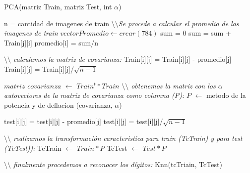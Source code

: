 \begin{algorithm}[H]
\caption{PCA(matriz Train, matriz Test, int $\alpha$)}
\begin{algorithmic}[1]
\State n = cantidad de imagenes de train
\State \textit{$\setminus\setminus$Se procede a calcular el promedio de las imagenes de train}
\State $ vector Promedio \gets crear(784)$
	\State sum = 0	
		\State sum = sum + Train[j][i]
	\EndFor
	\State promedio[i] = sum/n
\EndFor

\State \textit{$\setminus\setminus$ calculamos la matriz de covarianza:}
		\State Train[i][j] = Train[i][j] - promedio[j]
	\EndFor
	\State Train[i][j] = Train[i][j]/$\sqrt{n-1}$
\EndFor	

\State $matriz$ $covarianza$ $\gets$ $Train^{t}*Train$	
\State \textit{$\setminus\setminus$ obtenemos la matriz con los $\alpha$ autovectores de la matriz de covarianza como columna (P):}
\State $P$ $\gets$ metodo de la potencia y de deflacion (covarianza, $\alpha$)

		\State test[i][j] = test[i][j] - promedio[j]
	\EndFor
	\State test[i][j] = test[i][j]/$\sqrt{n-1}$
\EndFor	

\State \textit{$\setminus\setminus$ realizamos la transformaci\'on caracteristica para train (TcTrain) y para test (TcTest)):}
\State  TcTrain $\gets$ $Train*P$
\State  TcTest $\gets$ $Test*P$


\State \textit{$\setminus\setminus$ finalmente procedemos a reconocer los d\'igitos:}
\State Knn(tcTriain, TcTest)
\end{algorithmic}
\end{algorithm}


